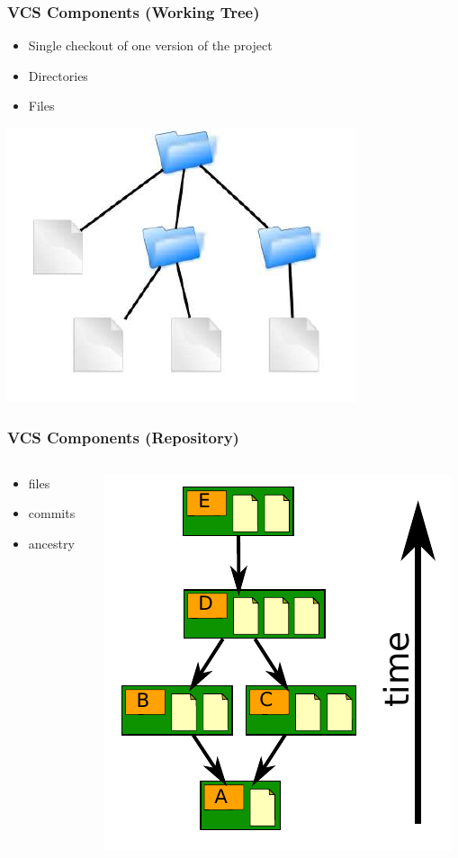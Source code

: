 \documentclass[english,compress]{beamer}
\begin{document}
\frame
{
    \frametitle{VCS Components (Working Tree)}

    \begin{itemize}
        \item Single checkout of one version of the project
        \item Directories
        \item Files
    \end{itemize}
    \begin{center}
        \includegraphics[height=.3\textwidth]{figs/working-tree.png}
    \end{center}
}

\frame
{
    \frametitle{VCS Components (Repository)}

    \begin{columns}
        \begin{column}{.5\textwidth}
    \begin{itemize}
        \item files
        \item commits
        \item ancestry
    \end{itemize}
\end{column}
\begin{column}{.5\textwidth}
    \includegraphics[width=.8\textwidth]{figs/repo.png}
\end{column}
\end{columns}
}
\end{document}
